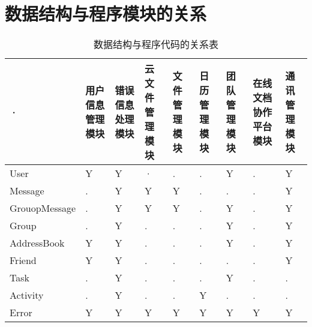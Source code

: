    \section{数据结构与程序模块的关系}
        \begin{table}[htbp]
            \centering
            \caption{数据结构与程序代码的关系表} \label{tab:datastructure-module}
            \begin{tabular}{|p{9em}|p{2.5em}|p{2.5em}|p{2.5em}|p{2.5em}|p{2.5em}|
                            p{2.5em}|p{2.5em}|p{2.5em}|}
                \hline %
            ·   & 用户信息管理模块      & 错误信息处理模块  & 云文件管理模块 
                & 文件管理模块          & 日历管理模块      & 团队管理模块      
                & 在线文档协作平台模块  & 通讯管理模块\\
                \hline
                User                & Y   & Y     & · 
                                    & .   & .     & Y
                                    & .   & Y     \\
                \hline
                Message             & .   & Y     & Y 
                                    & Y   & .     & .
                                    & .   & Y     \\
                \hline
                GrouopMessage       & .   & Y     & Y 
                                    & Y   & .     & Y
                                    & .   & Y     \\
                \hline
                Group               & .   & Y     & . 
                                    & .   & .     & Y
                                    & .   & Y     \\
                \hline
                AddressBook         & Y   & Y     & . 
                                    & .   & .     & Y
                                    & .   & Y     \\
                \hline
                Friend              & Y   & Y     & . 
                                    & .   & .     & .
                                    & .   & Y     \\
                \hline
                Task                & .   & Y     & . 
                                    & .   & .     & Y
                                    & .   & .     \\
                \hline
                Activity            & .   & Y     & . 
                                    & .   & Y     & .
                                    & .   & .     \\
                \hline
                Error               & Y   & Y     & Y 
                                    & Y   & Y     & Y
                                    & Y   & Y     \\
                

\end{tabular}
\end{table}
